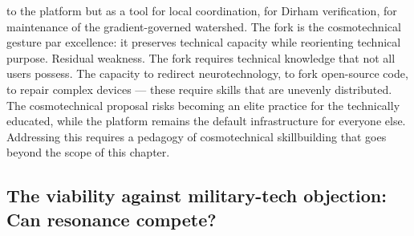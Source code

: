 to the platform but as a tool for local coordination, for Dirham verification, for maintenance of the gradient-governed watershed. The fork is the cosmotechnical gesture par excellence: it preserves technical capacity while reorienting technical purpose. Residual weakness. The fork requires technical knowledge that not all users possess. The capacity to redirect neurotechnology, to fork open-source code, to repair complex devices — these require skills that are unevenly distributed. The cosmotechnical proposal risks becoming an elite practice for the technically educated, while the platform remains the default infrastructure for everyone else. Addressing this requires a pedagogy of cosmotechnical skillbuilding that goes beyond the scope of this chapter.

\subsection{The viability against military-tech objection: Can resonance compete?}

